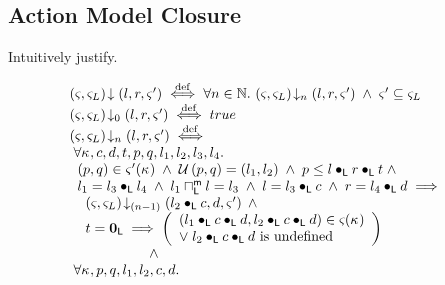 \subsection{Action Model Closure}
\todo Intuitively justify.
\begin{definition}
%
\[
\hspace*{-0.2cm}
\begin{array}{l}
	\extendsAM{\amod{}, \amod{L}}{l}{r}{\amod{}'} \iffdef \for{n \in \Nats} \extendsAMUpto{\amod{}, \amod{L}}{n}{l}{r}{\amod{}'}  \;\land\; \amod{}' \subseteq \amod{L}\\
	
	
	\extendsAMUpto{\amod{}, \amod{L}}{0}{l}{r}{\amod{}'} \iffdef true \\ 



	\extendsAMUpto{\amod{}, \amod{L}}{n}{l}{r}{\amod{}'} \iffdef \\ 

	\hspace*{0.1cm}\for{\ca{}, c, d, t, p, q, l_1, l_2, l_3, l_4}\\
	
	\hspace*{0.2cm}(p, q) \in \amod{}'(\ca{}) 
	\;\land\; \updateFP{p, q} = (l_1, l_2)
	\;\land\; p \leq  l \composeL r \composeL t \;\land\\
	
	\hspace*{0.2cm}l_1 = l_3 \composeL l_4 
	\;\land\; l_1 \maxMeetL l = l_3 
	\;\land\; l = l_3 \composeL c 
	\;\land\; r = l_4 \composeL d \implies\\
	
	\hspace*{0.4cm} \extendsAMUpto{\amod{}, \amod{L}}{(n-1)}{l_2 \composeL c}{d}{\amod{}'} \;\land\\
	\hspace*{0.4cm}t = \unitL \implies 
	\left(
	\begin{array}{l}
		(l_1 \composeL c \composeL d, l_2 \composeL c \composeL d) \in \amod{}(\ca{})\\
		\lor\; l_2 \composeL c \composeL d \text{ is undefined} 
	\end{array}
	\right)\\
	
		\hspace*{2cm} \land\\
	

  \hspace*{0.1cm}\for{\ca{}, p, q, l_1, l_2, c, d} \\
  

\end{array}\]
\end{definition}
